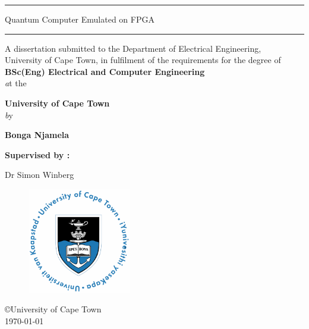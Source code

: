 \begin{titlepage}
	\begin{center}
		\hrule%
		\vspace*{0.5cm}
		
		\begin{large}
			{\sc Quantum Computer Emulated on FPGA}%
		\end{large}
		
		\vspace*{0.8cm}
		\hrule%
		
		\vspace*{1cm}
		\begin{small}
			{\sf A dissertation submitted to the Department of Electrical Engineering,\\}
			{\sc University of Cape Town, }
			{\sf in fulfilment of the requirements for the degree of \\}
			\vspace*{0.5cm}
			{\sc\bf BSc(Eng) Electrical and Computer Engineering\\} %
			\vspace*{0.5cm}
			{\emph at the \\}
			\vspace*{0.5cm}
			
			{\sc\bf University of Cape Town \\} 
			\vspace*{0.5cm}
			{\emph by \\}
			\vspace*{0.5cm}
			
			{\sf\bf Bonga Njamela \\} 
			
		\end{small}
		\vspace*{0.5cm}
		{\sf\bf Supervised by :\\}
		
		{\sc Dr Simon Winberg}
		
		\vfill
		\begin{figure}[!ht]
			\centering
			\includegraphics[width=4.5cm]{frontmatter/uctlogomain.png}
		\end{figure}
		\vspace*{0.5cm}
		\copyright University of Cape Town \\
		{\sf \today}
	\end{center}
\end{titlepage}

